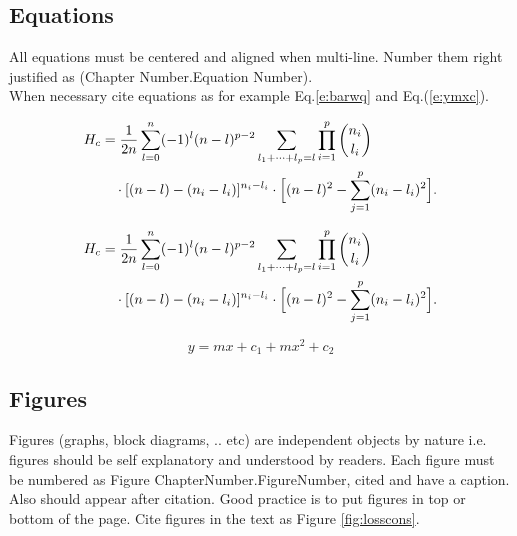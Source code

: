 \subsection{Equations}
All equations must be centered and aligned when multi-line. Number them right justified as (Chapter Number.Equation Number). \\
When necessary cite equations as for example Eq.\eqref{e:barwq} and Eq.(\ref{e:ymxc}).


\begin{equation}\label{e:barwq1}\begin{split}
H_c&=\frac{1}{2n} \sum^n_{l=0}(-1)^{l}(n-{l})^{p-2}
\sum_{l _1+\dots+ l _p=l}\prod^p_{i=1} \binom{n_i}{l _i}\\
&\quad\cdot[(n-l )-(n_i-l _i)]^{n_i-l _i}\cdot
\Bigl[(n-l )^2-\sum^p_{j=1}(n_i-l _i)^2\Bigr].
\end{split}\end{equation}

\begin{equation}\label{e:barwq}\begin{split}
H_c&=\frac{1}{2n} \sum^n_{l=0}(-1)^{l}(n-{l})^{p-2}
\sum_{l _1+\dots+ l _p=l}\prod^p_{i=1} \binom{n_i}{l _i}\\
&\quad\cdot[(n-l )-(n_i-l _i)]^{n_i-l _i}\cdot
\Bigl[(n-l )^2-\sum^p_{j=1}(n_i-l _i)^2\Bigr].
\end{split}\end{equation}

\begin{equation}\label{e:ymxc}
y = mx+c_1 + mx^2+c_2
\end{equation}

\subsection{Figures}
Figures (graphs, block diagrams, .. etc) are independent objects by nature i.e. figures should be self explanatory and understood by readers. Each figure must be numbered as Figure ChapterNumber.FigureNumber, cited and have a caption. Also should appear after citation. Good practice is to put figures in top or bottom of the page. Cite figures in the text as Figure \ref{fig:losscons}.


